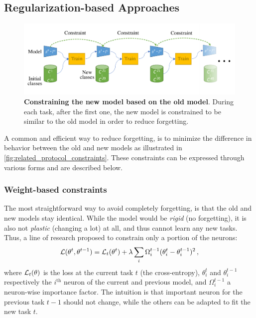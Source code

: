 \subsection{Regularization-based Approaches}
\label{sec:related_regul}


\begin{figure}[tb]
      \begin{center}
            \includegraphics[width=1.0\linewidth]{images/related/constraints}
      \end{center}
      \caption{\textbf{Constraining the new model based on the old model}. During each task, after
            the first one, the new model is constrained to be similar to the old model in order to reduce
            forgetting.}
      \label{fig:related_protocol_constraints}
\end{figure}

A common and efficient way to reduce forgetting, is to minimize the difference in behavior between
the old and new models as illustrated in \autoref{fig:related_protocol_constraints}. These constraints can be
expressed through various forms and are described below.

\subsubsection{Weight-based constraints}
\label{sec:related_regul_weight}


The most straightforward way to avoid completely forgetting, is that the old and new models stay
identical. While the model would be \textit{rigid} (no forgetting), it is also not \textit{plastic}
(changing a lot) at all, and thus cannot learn any new tasks. Thus, a line of research proposed to
constrain only a portion of the neurons:
%
\begin{equation}
      \mathcal{L}(\theta^t, \theta^{t-1}) = \mathcal{L}_t(\theta^t) + \lambda \sum_i \Omega_i^{t-1} (\theta^t_i - \theta_i^{t-1})^2\,,
      \label{eq:related_weight_constraint}
\end{equation}
%
where $\mathcal{L}_t(\theta)$ is the loss at the current task $t$ (\eg the cross-entropy), $\theta_i^t$
and $\theta_i^{t-1}$ respectively the $i^\text{th}$ neuron of the current and previous model, and
$\Omega_i^{t-1}$ a neuron-wise importance factor. The intuition is that important neuron for the
previous task $t-1$ should not change, while the others can be adapted to fit the new task $t$.


